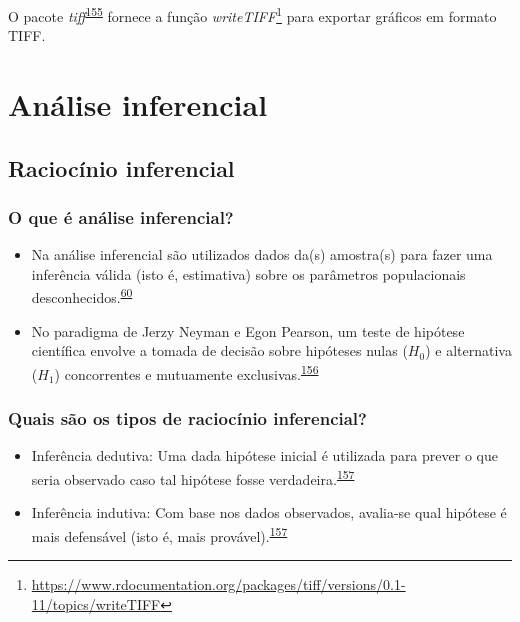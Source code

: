 \documentclass[
  a4paper,
]{book}
\renewcommand{\href}[2]{#2\footnote{\url{#1}}}
\newenvironment{infobox}[1]
  {
  \begin{itemize}
  \renewcommand{\labelitemi}{
    \raisebox{-.7\height}[0pt][0pt]{
      {\setkeys{Gin}{width=3em,keepaspectratio}
        \texttt{[image: \#1]}}
    }
  }
  \setlength{\fboxsep}{1em}
  \begin{blackbox}
  \item
  }
  {
  \end{blackbox}
  \end{itemize}
  }
\begin{document}
\begin{infobox}{images/Rlogo}
O pacote \emph{tiff}\textsuperscript{\protect\hyperlink{ref-tiff}{155}} fornece a função \href{https://www.rdocumentation.org/packages/tiff/versions/0.1-11/topics/writeTIFF}{\emph{writeTIFF}} para exportar gráficos em formato TIFF.

\end{infobox}

\hypertarget{analise-inferencial}{%
\chapter{\texorpdfstring{\textbf{Análise inferencial}}{Análise inferencial}}\label{analise-inferencial}}

\hypertarget{raciocinio-inferencial}{%
\section{Raciocínio inferencial}\label{raciocinio-inferencial}}

\hypertarget{o-que-uxe9-anuxe1lise-inferencial}{%
\subsection{O que é análise inferencial?}\label{o-que-uxe9-anuxe1lise-inferencial}}

\begin{itemize}
\item
  Na análise inferencial são utilizados dados da(s) amostra(s) para fazer uma inferência válida (isto é, estimativa) sobre os parâmetros populacionais desconhecidos.\textsuperscript{\protect\hyperlink{ref-vetter2017}{60}}
\item
  No paradigma de Jerzy Neyman e Egon Pearson, um teste de hipótese científica envolve a tomada de decisão sobre hipóteses nulas (\(H_{0}\)) e alternativa (\(H_{1}\)) concorrentes e mutuamente exclusivas.\textsuperscript{\protect\hyperlink{ref-Curran-Everett2009}{156}}
\end{itemize}

\hypertarget{quais-suxe3o-os-tipos-de-raciocuxednio-inferencial}{%
\subsection{Quais são os tipos de raciocínio inferencial?}\label{quais-suxe3o-os-tipos-de-raciocuxednio-inferencial}}

\begin{itemize}
\item
  Inferência dedutiva: Uma dada hipótese inicial é utilizada para prever o que seria observado caso tal hipótese fosse verdadeira.\textsuperscript{\protect\hyperlink{ref-goodman1999}{157}}
\item
  Inferência indutiva: Com base nos dados observados, avalia-se qual hipótese é mais defensável (isto é, mais provável).\textsuperscript{\protect\hyperlink{ref-goodman1999}{157}}
\end{itemize}
\end{document}
